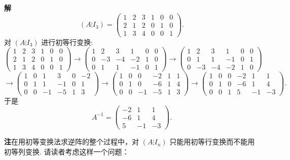 \documentclass[UTF8,12pt,a4paper,fontset=fandol]{ctexart}
\begin{document}
\noindent\textbf{解}\quad
\[
(A\vdots I_3)=
\left(\begin{array}{ccc|ccc}
1 & 2 & 3 & 1 & 0 & 0\\
2 & 1 & 2 & 0 & 1 & 0\\
1 & 3 & 4 & 0 & 0 & 1
\end{array}\right).
\]
对 $(A\vdots I_3)$ 进行初等行变换:
\[
\left(\begin{array}{ccc|ccc}
1 & 2 & 3 & 1 & 0 & 0\\
2 & 1 & 2 & 0 & 1 & 0\\
1 & 3 & 4 & 0 & 0 & 1
\end{array}\right)
\longrightarrow
\left(\begin{array}{ccc|ccc}
1 & 2 & 3 & 1 & 0 & 0\\
0 & -3 & -4 & -2 & 1 & 0\\
0 & 1 & 1 & -1 & 0 & 1
\end{array}\right)
\longrightarrow
\left(\begin{array}{ccc|ccc}
1 & 2 & 3 & 1 & 0 & 0\\
0 & 1 & 1 & -1 & 0 & 1\\
0 & -3 & -4 & -2 & 1 & 0
\end{array}\right)
\]
\[
\longrightarrow
\left(\begin{array}{ccc|ccc}
1 & 0 & 1 & 3 & 0 & -2\\
0 & 1 & 1 & -1 & 0 & 1\\
0 & 0 & -1 & -5 & 1 & 3
\end{array}\right)
\longrightarrow
\left(\begin{array}{ccc|ccc}
1 & 0 & 0 & -2 & 1 & 1\\
0 & 1 & 0 & -6 & 1 & 4\\
0 & 0 & -1 & -5 & 1 & 3
\end{array}\right)
\longrightarrow
\left(\begin{array}{ccc|ccc}
1 & 0 & 0 & -2 & 1 & 1\\
0 & 1 & 0 & -6 & 1 & 4\\
0 & 0 & 1 & 5 & -1 & -3
\end{array}\right).
\]
于是
\[
A^{-1}=\left(\begin{array}{rrr}
-2 & 1 & 1\\
-6 & 1 & 4\\
5 & -1 & -3
\end{array}\right).
\]

\noindent\textbf{注}\quad 在用初等变换法求逆阵的整个过程中，对 $(A\vdots I_n)$ 只能用初等行变换而不能用初等列变换. 请读者考虑这样一个问题：
\end{document}
